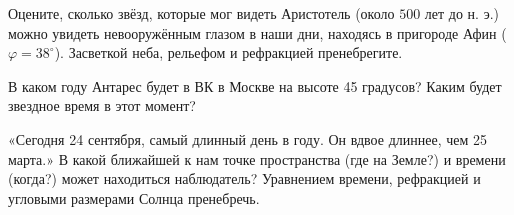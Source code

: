 \documentclass[14pt]{extarticle}
\begin{document}
Оцените, сколько звёзд, которые мог видеть Аристотель (около $500$ лет
	до н. э.) можно увидеть невооружённым глазом в наши дни, находясь
	в пригороде Афин ($\varphi =38^\circ$). Засветкой неба, рельефом и рефракцией
	пренебрегите.

В каком году Антарес будет в ВК в Москве на высоте 45 градусов? Каким будет звездное время в этот момент?

«Сегодня 24 сентября, самый длинный день в году. Он вдвое длиннее, чем 25 марта.»
	В какой ближайшей к нам точке пространства (где на Земле?) и времени
	(когда?) может находиться наблюдатель? Уравнением времени, рефракцией и угловыми размерами
	Солнца пренебречь.
\end{document}
